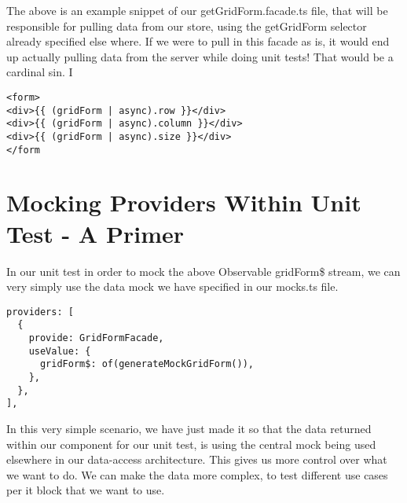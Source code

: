 The above is an example snippet of our getGridForm.facade.ts file, that will
be responsible for pulling data from our store, using the getGridForm selector
already specified else where. If we were to pull in this facade as is, it would
end up actually pulling data from the server while doing unit tests! That would
be a cardinal sin. I
\begin{verbatim}
<form>
<div>{{ (gridForm | async).row }}</div>
<div>{{ (gridForm | async).column }}</div>
<div>{{ (gridForm | async).size }}</div>
</form
\end{verbatim}

\section{ Mocking Providers Within Unit Test - A Primer }
In our unit test in order to mock the above Observable gridForm\$ stream, we
can very simply use the data mock we have specified in our mocks.ts file.
\begin{lstlisting}
providers: [
  {
    provide: GridFormFacade,
    useValue: {
      gridForm$: of(generateMockGridForm()),
    },
  },
],
\end{lstlisting}

In this very simple scenario, we have just made it so that the data returned
within our component for our unit test, is using the central mock being used
elsewhere in our data-access architecture. This gives us more control over what
we want to do. We can make the data more complex, to test different use cases
per it block that we want to use.

